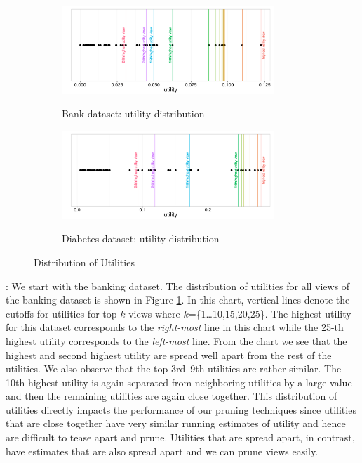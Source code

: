 \begin{figure}[h]
	\centering
	\begin{subfigure}{1\linewidth}
		\centering
		{\includegraphics[width=8cm]
		{Images/bank_utility_distribution.pdf}}
		\caption{Bank dataset: utility distribution}
		\label{fig:bank_utility_distribution}
	\end{subfigure}
	
	\begin{subfigure}{1\linewidth}
		\centering
		{\includegraphics[width=8cm]
		{Images/diabetes_utility_distribution.pdf}}
		\caption{Diabetes dataset: utility distribution}
		\label{fig:diabetes_utility_distribution}
	\end{subfigure}
\label{fig:utility_distribution}
\caption{Distribution of Utilities }
\end{figure}


:
We start with the banking dataset.
The distribution of utilities for all views of the banking dataset is
shown in Figure \ref{fig:bank_utility_distribution}. 
In this chart, vertical lines denote the cutoffs for utilities for top-$k$ views
where $k$=\{1\ldots10,15,20,25\}.
The highest utility for this dataset corresponds to the {\it right-most} line
in this chart while the 25-th highest utility corresponds to the {\it left-most}
line.
From the chart we see that the
highest and second highest utility are spread well apart from the rest of the
utilities.
We also observe that the top 3rd--9th utilities are rather similar. 
The 10th highest utility is again separated from neighboring utilities by a
large value and then the remaining utilities are again close together.
This distribution of utilities directly impacts the performance of our pruning
techniques since utilities that are close together have very similar running
estimates of utility and hence are difficult to tease apart and prune.
Utilities that are spread apart, in contrast, have estimates that are also
spread apart and we can prune views easily.

